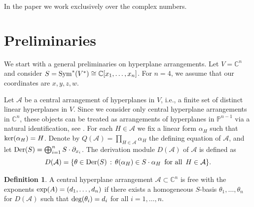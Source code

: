 \documentclass[11pt]{article}
\theoremstyle{plain}
\theoremstyle{definition}
\newtheorem{definition}[thm]{Definition}
\begin{document}
In the paper we work exclusively over the complex numbers.

\section{Preliminaries}
We start with a general preliminaries on hyperplane arrangements. Let $V = \mathbb{C}^{n}$ and consider $S = {\rm Sym}^{*}(V^{*}) \cong \mathbb{C}[x_{1}, \ldots , x_{n}]$. For $n=4$, we assume that our coordinates are $x, y, z, w$. 

Let $\mathcal{A}$ be a central arrangement of hyperplanes in $V$, i.e., a finite set of distinct linear hyperplanes in $V$. Since we consider only central hyperplane arrangements in $\mathbb{C}^{n}$, these objects can be treated as arrangements of hyperplanes in $\mathbb{P}^{n-1}$ via a natural identification, see \cite[Definition 2.4]{Dimca}. For each $H \in \mathcal{A}$ we fix a linear form $\alpha_{H}$ such that ${\rm ker}(\alpha_{H}) = H$. Denote by $Q(\mathcal{A}) = \prod_{H \in \mathcal{A}}\alpha_{H}$ the defining equation of $\mathcal{A}$, and let ${\rm Der}(S) =\bigoplus_{i=1}^{n} S\cdot \partial_{x_{i}}$.
The derivation module $D(\mathcal{A})$ of $\mathcal{A}$ is defined as
$$D(\mathcal{A}) = \{\theta \in {\rm Der}(S) \, : \, \theta(\alpha_{H}) \in S \cdot \alpha_{H} \,\text{ for all } \, H \in \mathcal{A}\}.$$
\begin{definition}
A central hyperplane arrangement $\mathcal{A} \subset \mathbb{C}^{n}$ is free with the exponents ${\rm exp}(A) = (d_{1}, \ldots ,d_{n})$ if there exists a homogeneous $S$-basis $\theta_{1}, \ldots , \theta_{n}$ for $D(\mathcal{A})$ such that ${\rm deg} (\theta_{i}) = d_{i}$ for all $i=1,\ldots,n$.
\end{definition}
\end{document}

